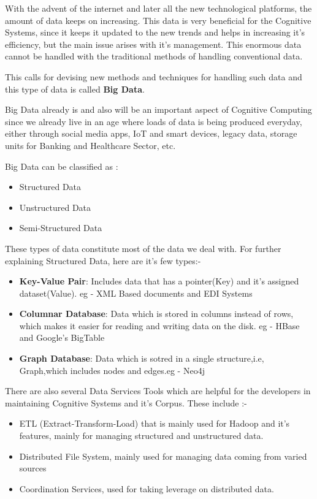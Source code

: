 With the advent of the internet and later all the new technological platforms,
the amount of data keeps on increasing. This data is very beneficial for the
Cognitive Systems, since it keeps it updated to the new trends and helps in
increasing it's efficiency, but the main issue arises with it's management.
This enormous data cannot be handled with the traditional methods of handling
conventional data.

This calls for devising new methods and techniques for handling such data and
this type of data is called \textbf{Big Data}.

Big Data already is and also will be an important aspect of Cognitive Computing
since we already live in an age where loads of data is being produced everyday,
either through social media apps, IoT and smart devices, legacy data, storage
units for Banking and Healthcare Sector, etc.

Big Data can be classified as :

\begin{itemize}
	\item Structured Data

	\item Unstructured Data

	\item Semi-Structured Data
\end{itemize}

These types of data constitute most of the data we deal with. For further
explaining Structured Data, here are it's few types:-

\begin{itemize}
	\item \textbf{Key-Value Pair}: Includes data that has a pointer(Key) and it's assigned dataset(Value). eg - XML Based documents and EDI Systems


	\item \textbf{Columnar Database}: Data which is stored in columns instead of rows, which makes it easier for reading and writing data on the disk. eg - HBase and Google's BigTable

	\item \textbf{Graph Database}: Data which is sotred in a single structure,i.e, Graph,which includes nodes and edges.eg - Neo4j
\end{itemize}

There are also several Data Services Tools which are helpful for the developers
in maintaining Cognitive Systems and it's Corpus. These include :-

\begin{itemize}
	\item ETL (Extract-Transform-Load) that is mainly used for Hadoop and it's features,
	      mainly for managing structured and unstructured data.

	\item Distributed File System, mainly used for managing data coming from varied
	      sources

	\item Coordination Services, used for taking leverage on distributed data.
\end{itemize}
